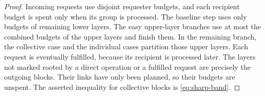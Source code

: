\begin{proof}
Incoming requests use disjoint requester budgets, and each recipient budget is spent only when its group is processed. The baseline step uses only budgets of remaining lower layers. The easy upper-layer branches use at most the combined budgets of the upper layers and finish them. In the remaining branch, the collective case and the individual cases partition those upper layers. Each request is eventually fulfilled, because its recipient is processed later. The layers not marked rooted by a direct operation or a fulfilled request are precisely the outgoing blocks. Their links have only been planned, so their budgets are unspent. The asserted inequality for collective blocks is \eqref{eq:sharp-band}.
\end{proof}

